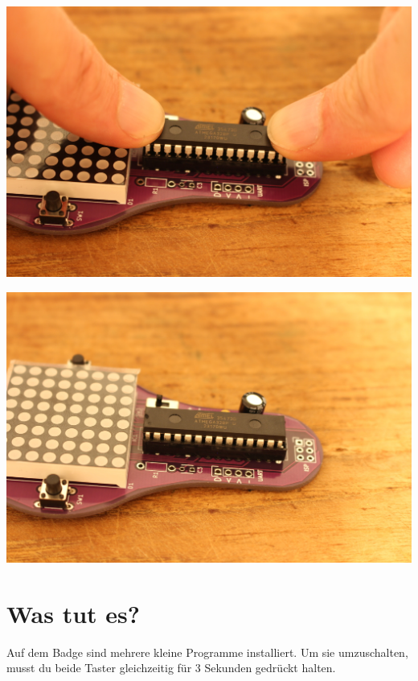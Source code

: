 \documentclass{article}
\begin{document}
\vspace{0.5cm}

\begin{minipage}[b]{0.5\textwidth}
	\includegraphics[width=\textwidth]{Bilder2024/IMG_0083.JPG}
\end{minipage}
\begin{minipage}[b]{0.5\textwidth}
	\includegraphics[width=\textwidth]{Bilder2024/IMG_0084.JPG}
\end{minipage}

\vspace{0.5cm}


\section{Was tut es?}

Auf dem Badge sind mehrere kleine Programme installiert. Um sie umzuschalten, musst du beide Taster gleichzeitig für 3 Sekunden gedrückt halten.\\
\end{document}
